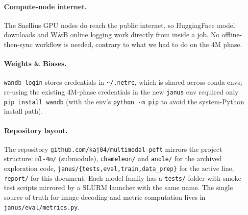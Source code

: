 \paragraph{Compute-node internet.} The Snellius GPU nodes do reach the
public internet, so HuggingFace model downloads and W\&B online logging
work directly from inside a job. No offline-then-sync workflow is needed,
contrary to what we had to do on the 4M phase.

\paragraph{Weights \& Biases.} \texttt{wandb login} stores credentials in
\texttt{\textasciitilde/.netrc}, which is shared across conda envs;
re-using the existing 4M-phase credentials in the new \texttt{janus} env
required only \texttt{pip install wandb} (with the env's \texttt{python -m
pip} to avoid the system-Python install path).

\paragraph{Repository layout.} The repository
\texttt{github.com/kaj04/multimodal-peft} mirrors the project structure:
\texttt{ml-4m/} (submodule), \texttt{chameleon/} and \texttt{anole/} for
the archived exploration code, \texttt{janus/\{tests,eval,train,data\_prep\}}
for the active line, \texttt{report/} for this document. Each model family
has a \texttt{tests/} folder with smoke-test scripts mirrored by a SLURM
launcher with the same name. The single source of truth for image decoding
and metric computation lives in \texttt{janus/eval/metrics.py}.
